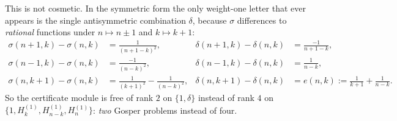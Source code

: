 \documentclass[11pt,reqno]{amsart}
\theoremstyle{plain}
\theoremstyle{definition}
\theoremstyle{remark}
\newcommand{\HH}[2]{H^{(#1)}_{#2}}
\numberwithin{equation}{section}
\begin{document}
This is not cosmetic. In the symmetric form the only weight-one letter that ever appears is
the single antisymmetric combination $\delta$, because $\sigma$ differences to
\emph{rational} functions under $n\mapsto n\pm1$ and $k\mapsto k+1$:
\begin{equation}\label{eq:diffs}
\begin{aligned}
  \sigma(n+1,k)-\sigma(n,k)&=\frac{1}{(n+1-k)^2},&
  \delta(n+1,k)-\delta(n,k)&=\frac{-1}{n+1-k},\\
  \sigma(n-1,k)-\sigma(n,k)&=\frac{-1}{(n-k)^2},&
  \delta(n-1,k)-\delta(n,k)&=\frac{1}{n-k},\\
  \sigma(n,k+1)-\sigma(n,k)&=\tfrac1{(k+1)^2}-\tfrac1{(n-k)^2},&
  \delta(n,k+1)-\delta(n,k)&=e(n,k):=\tfrac1{k+1}+\tfrac1{n-k}.
\end{aligned}
\end{equation}
So the certificate module is free of rank $2$ on $\{1,\delta\}$ instead of rank $4$ on
$\{1,\HH1k,\HH1{n-k},\HH1n\}$: \emph{two} Gosper problems instead of four.
\end{document}
